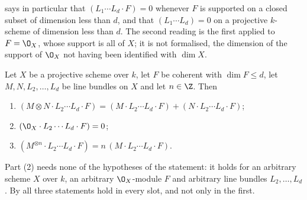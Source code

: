 \begin{remark}
\label{rem:deg-intersection-small-support}
 says in particular that
$(L_1\cdots L_d\cdot F)=0$ whenever $F$ is supported on a closed subset of
dimension less than $d$, and that $(L_1\cdots L_d)=0$ on a projective
$k$-scheme of dimension less than $d$.  The second reading is the first applied
to $F=\O_X$, whose support is all of $X$; it is not formalised, the dimension
of the support of $\O_X$ not having been identified with $\dim X$.
\end{remark}

\begin{theorem}[Multilinearity]\label{thm:deg-intersection-multilinear}
Let $X$ be a projective scheme over $k$, let $F$ be coherent with $\dim F\leq
d$, let $M,N,L_2,\dots,L_d$ be line bundles on $X$ and let $n\in\Z$.  Then
\begin{enumerate}
  \item $(M\otimes N\cdot L_2\cdots L_d\cdot F)
        =(M\cdot L_2\cdots L_d\cdot F)+(N\cdot L_2\cdots L_d\cdot F)$;
  \item $(\O_X\cdot L_2\cdots L_d\cdot F)=0$;
  \item $(M^{\otimes n}\cdot L_2\cdots L_d\cdot F)
        =n\,(M\cdot L_2\cdots L_d\cdot F)$.
\end{enumerate}
Part (2) needs none of the hypotheses of the statement: it holds for an
arbitrary scheme $X$ over $k$, an arbitrary $\O_X$-module $F$ and arbitrary
line bundles $L_2,\dots,L_d$.  By  all
three statements hold in every slot, and not only in the first.
\end{theorem}
